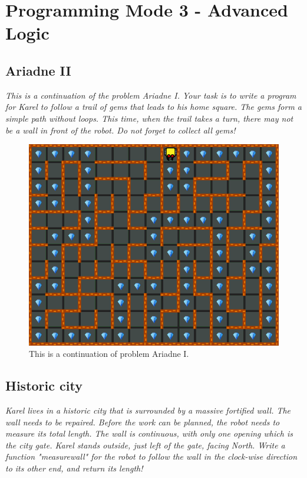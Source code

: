 \section{Programming Mode 3 - Advanced Logic}

\subsection{Ariadne II}

{\em This is a continuation of the problem Ariadne I. Your task is to write a program for Karel to follow a trail of gems that leads to his home square. The gems form a simple path without loops. This time, when the trail takes a turn, there may not be a wall in front of the robot. Do not forget to collect all gems!}

\begin{figure}[!ht]
\begin{center}
\includegraphics[height=0.4\textwidth]{img/f14.png}
\end{center}
\vspace{-4mm}
\caption{This is a continuation of problem Ariadne I.}
\label{fig:g10b}
\end{figure}

\newpage

\subsection{Historic city}

{\em Karel lives in a historic city that is surrounded by a massive fortified wall. The wall needs to be repaired. Before the work can be planned, the robot needs to measure its total length. The wall is continuous, with only one opening which is the city gate. Karel stands outside, just left of the gate, facing North. Write a function "measurewall" for the robot to follow the wall in the clock-wise direction to its other end, and return its length!  }

